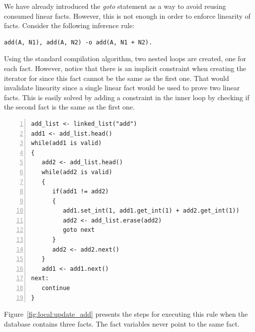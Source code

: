 We have already introduced the \emph{goto} statement as a way to avoid reusing
consumed linear facts. However, this is not enough in order to enforce
linearity of facts. Consider the following inference rule:

\begin{Verbatim}[fontsize=\codesize]
add(A, N1), add(A, N2) -o add(A, N1 + N2).
\end{Verbatim}

Using the standard compilation algorithm, two nested loops are created, one for
each  fact. However, notice that there is an implicit constraint when
creating the iterator for  since this fact cannot be the same
as the first one. That would invalidate linearity since a single linear fact
would be used to prove two linear facts. This is easily solved by adding a
constraint in the inner loop by checking if the second fact is the same as the
first one.

\begin{Verbatim}[numbers=left,fontsize=\codesize]
add_list <- linked_list("add")
add1 <- add_list.head()
while(add1 is valid)
{
   add2 <- add_list.head()
   while(add2 is valid)
   {
      if(add1 != add2)
      {
         add1.set_int(1, add1.get_int(1) + add2.get_int(1))
         add2 <- add_list.erase(add2)
         goto next
      }
      add2 <- add2.next()
   }
   add1 <- add1.next()
next:
   continue
}
\end{Verbatim}

Figure~\ref{fig:local:update_add} presents the steps for executing this rule
when the database contains three facts. The fact variables never point to the
same fact.

